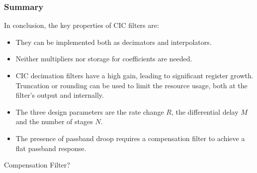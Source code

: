 \subsubsection{Summary}
\label{subsubsec:cic:summary}

In conclusion, the key properties of CIC filters are:
\begin{itemize}\tightlist
    \item
        They can be implemented both as decimators and interpolators.
    \item
        Neither multipliers nor storage for coefficients are needed.
    \item
        CIC  decimation  filters have  a  high  gain, leading  to  significant
        register  growth.  Truncation  or rounding  can be  used to  limit the
        resource usage, both at the filter's output and internally.
    \item
        The three design parameters are  the rate change $R$, the differential
        delay $M$ and the number of stages $N$.
    \item
        The  presence of  passband  droop requires  a  compensation filter  to
        achieve a flat passband response.
\end{itemize}

Compensation Filter?

